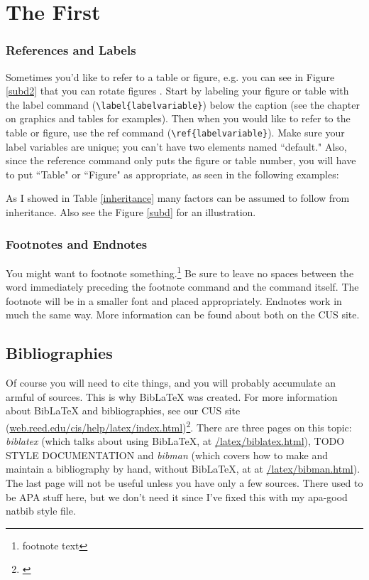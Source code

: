     \chapter{The First}
\subsection{References and Labels}
Sometimes you'd like to refer to a table or figure, e.g. you can see in Figure \ref{subd2} that you can rotate figures . Start by labeling your figure or table with the label command (\verb=\label{labelvariable}=) below the caption (see the chapter on graphics and tables for examples). Then when you would like to refer to the table or figure, use the ref command (\verb=\ref{labelvariable}=). Make sure your label variables are unique; you can't have two elements named ``default." Also, since the reference command only puts the figure or table number, you will have to put  ``Table" or ``Figure" as appropriate, as seen in the following examples: 

 As I showed in Table \ref{inheritance} many factors can be assumed to follow from inheritance. Also see the Figure \ref{subd} for an illustration.
 
\subsection{Footnotes and Endnotes}
	You might want to footnote something.\footnote{footnote text} Be sure to leave no spaces between the word immediately preceding the footnote command and the command itself. The footnote will be in a smaller font and placed appropriately. Endnotes work in much the same way. More information can be found about both on the CUS site.
	
\section{Bibliographies}
	Of course you will need to cite things, and you will probably accumulate an armful of sources. This is why BibLaTeX was created. For more information about BibLaTeX and bibliographies, see our CUS site (\url{web.reed.edu/cis/help/latex/index.html})\footnote{\cite{reedweb:2007}}. There are three pages on this topic: {\it biblatex} (which talks about using BibLaTeX, at \url{/latex/biblatex.html}), TODO STYLE DOCUMENTATION and {\it bibman} (which covers how to make and maintain a bibliography by hand, without BibLaTeX, at at \url{/latex/bibman.html}). The last page will not be useful unless you have only a few sources. There used to be APA stuff here, but we don't need it since I've fixed this with my apa-good natbib style file.
	
